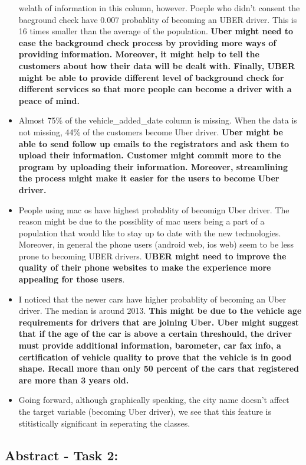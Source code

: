 \documentclass[11pt]{article}
\begin{document}
\begin{itemize}
  welath of information in this column, however. Poeple who didn't
  consent the bacground check have 0.007 probablity of becoming an UBER
  driver. This is 16 times smaller than the average of the population.
  \textbf{Uber might need to ease the background check process by
  providing more ways of providing information. Moreover, it might help
  to tell the customers about how their data will be dealt with.
  Finally, UBER might be able to provide different level of background
  check for different services so that more people can become a driver
  with a peace of mind.}
\item
  Almost 75\% of the vehicle\_added\_date column is missing. When the
  data is not missing, 44\% of the customers become Uber driver.
  \textbf{Uber might be able to send follow up emails to the
  registrators and ask them to upload their information. Customer might
  commit more to the program by uploading their information. Moreover,
  streamlining the process might make it easier for the users to become
  Uber driver.}
\item
  People using mac os have highest probablity of becomign Uber driver.
  The reason might be due to the possiblity of mac users being a part of
  a population that would like to stay up to date with the new
  technologies. Moreover, in general the phone users (android web, ios
  web) seem to be less prone to becoming UBER drivers. \textbf{UBER
  might need to improve the quality of their phone websites to make the
  experience more appealing for those users}.
\item
  I noticed that the newer cars have higher probablity of becoming an
  Uber driver. The median is around 2013. \textbf{This might be due to
  the vehicle age requirements for drivers that are joining Uber. Uber
  might suggest that if the age of the car is above a certain
  threshould, the driver must provide additional information, barometer,
  car fax info, a certification of vehicle quality to prove that the
  vehicle is in good shape. Recall more than only 50 percent of the cars
  that registered are more than 3 years old.}
\item
  Going forward, although graphically speaking, the city name doesn't
  affect the target variable (becoming Uber driver), we see that this
  feature is stitistically significant in seperating the classes.
\end{itemize}

    \subsection{Abstract - Task 2:}\label{abstract---task-2}
\end{document}
